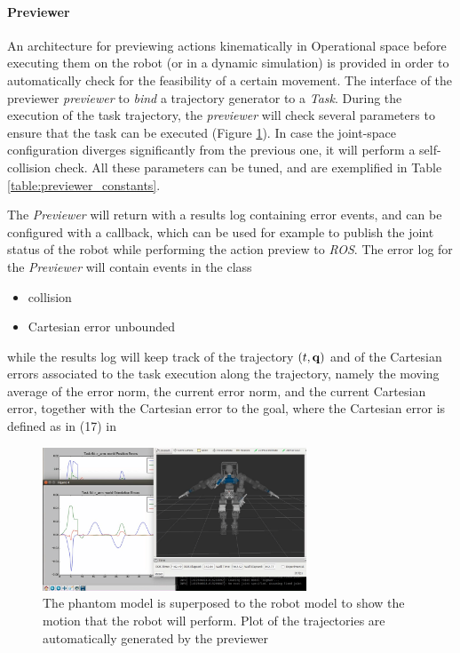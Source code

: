 \paragraph{Previewer}
\label{subsec:Previewer}
An architecture for previewing actions kinematically in Operational space before executing them on the robot (or in a dynamic simulation) is provided in order to automatically check for the feasibility of a certain movement. The interface of the previewer \emph{previewer} to \emph{bind} a trajectory generator to a \emph{Task}. During the execution of the task trajectory, the \emph{previewer} will check several parameters to ensure that the task can be executed (Figure \ref{fig:previewer}). In case the joint-space configuration diverges significantly from the previous one, it will perform a self-collision check. All these parameters can be tuned, and are exemplified in Table \ref{table:previewer_constants}.

The \emph{Previewer} will return with a results log containing error events, and can be configured with a callback, which can be used for example to publish the joint status of the robot while performing the action preview to \emph{ROS}.
The error log for the \emph{Previewer} will contain events in the class
\begin{itemize}
\item collision
\item Cartesian error unbounded
\end{itemize}
while the results log will keep track of the trajectory $(t,\mathbf{q})$ and of the Cartesian errors associated to the task execution along the trajectory, namely the moving average of the error norm, the current error norm, and the current Cartesian error, together with the Cartesian error to the goal, where the Cartesian error is defined as in (17) in \cite{rocchimingo:16}
\begin{figure}
\vspace{2 mm}
\centering \includegraphics[width=0.7\textwidth]{images/software/previewer} 
\caption{The phantom model is superposed to the robot model to show the motion that the robot will perform. Plot of the trajectories are automatically generated by the previewer} 
\label{fig:previewer}
\end{figure}

